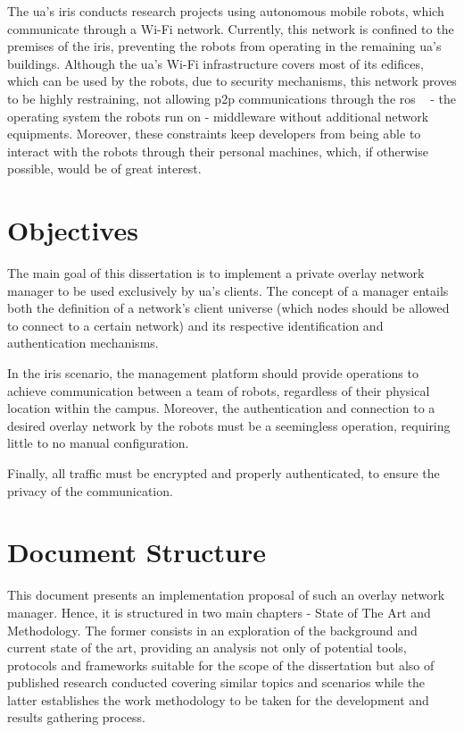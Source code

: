 \documentclass[11pt,twoside,a4paper]{report}
\begin{document}
The \ac{ua}'s \ac{iris} conducts research projects using autonomous mobile robots, which communicate through a Wi-Fi network. Currently, this network is confined to the premises of the \ac{iris}, preventing the robots from operating in the remaining \ac{ua}'s buildings. Although the \ac{ua}'s Wi-Fi infrastructure covers most of its edifices, which can be used by the robots, due to security mechanisms, this network proves to be highly restraining, not allowing \ac{p2p} communications through the \ac{ros} ~\cite{quigley2009ros} - the operating system the robots run on - middleware without additional network equipments. Moreover, these constraints keep developers from being able to interact with the robots through their personal machines, which, if otherwise possible, would be of great interest.

\section{Objectives}

The main goal of this dissertation is to implement a private overlay network manager to be used exclusively by \ac{ua}'s clients. The concept of a manager entails both the definition of a network's client universe (which nodes should be allowed to connect to a certain network) and its respective identification and authentication mechanisms.

In the \ac{iris} scenario, the management platform should provide operations to achieve communication between a team of robots, regardless of their physical location within the campus. Moreover, the authentication and connection to a desired overlay network by the robots must be a seemingless operation, requiring little to no manual configuration.

Finally, all traffic must be encrypted and properly authenticated, to ensure the privacy of the communication.

\section{Document Structure}

This document presents an implementation proposal of such an overlay network manager. Hence, it is structured in two main chapters - State of The Art and Methodology. The former consists in an exploration of the background and current state of the art, providing an analysis not only of potential tools, protocols and frameworks suitable for the scope of the dissertation but also of published research conducted covering similar topics and scenarios while the latter establishes the work methodology to be taken for the development and results gathering process.
\end{document}
